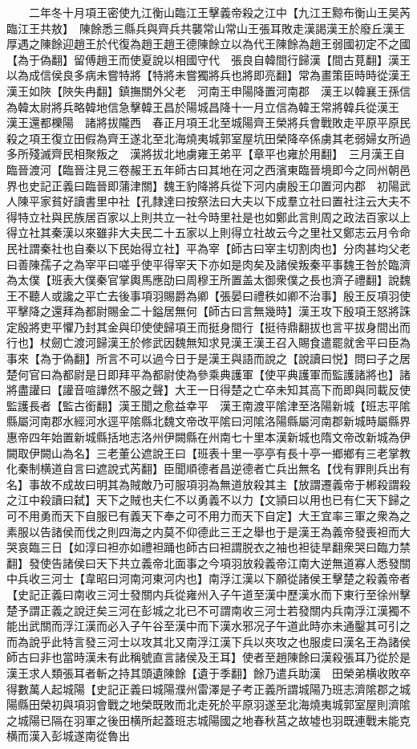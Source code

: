 　　二年冬十月項王密使九江衡山臨江王擊義帝殺之江中【九江王黥布衡山王吴芮臨江王共敖】　陳餘悉三縣兵與齊兵共襲常山常山王張耳敗走漢謁漢王於廢丘漢王厚遇之陳餘迎趙王於代復為趙王趙王德陳餘立以為代王陳餘為趙王弱國初定不之國【為于偽翻】留傅趙王而使夏說以相國守代　張良自韓間行歸漢【間古莧翻】漢王以為成信侯良多病未嘗特將【特將未嘗獨將兵也將即亮翻】常為畫策臣時時從漢王　漢王如陜【陜失冉翻】鎮撫關外父老　河南王申陽降置河南郡　漢王以韓襄王孫信為韓太尉將兵略韓地信急擊韓王昌於陽城昌降十一月立信為韓王常將韓兵從漢王　漢王還都櫟陽　諸將拔隴西　春正月項王北至城陽齊王榮將兵會戰敗走平原平原民殺之項王復立田假為齊王遂北至北海燒夷城郭室屋坑田榮降卒係虜其老弱婦女所過多所殘滅齊民相聚叛之　漢將拔北地虜雍王弟平【章平也雍於用翻】　三月漢王自臨晉渡河【臨晉注見三卷赧王五年師古曰其地在河之西濱東臨晉境即今之同州朝邑界也史記正義曰臨晉即蒲津關】魏王豹降將兵從下河内虜殷王卬置河内郡　初陽武人陳平家貧好讀書里中社【孔隸達曰按祭法曰大夫以下成羣立社曰置社注云大夫不得特立社與民族居百家以上則共立一社今時里社是也如鄭此言則周之政法百家以上得立社其秦漢以來雖非大夫民二十五家以上則得立社故云今之里社又鄭志云月令命民社謂秦社也自秦以下民始得立社】平為宰【師古曰宰主切割肉也】分肉甚均父老曰善陳孺子之為宰平曰嗟乎使平得宰天下亦如是肉矣及諸侯叛秦平事魏王咎於臨濟為太僕【班表大僕秦官掌輿馬應劭曰周穆王所置盖太御衆僕之長也濟子禮翻】說魏王不聽人或讒之平亡去後事項羽賜爵為卿【張晏曰禮秩如卿不治事】殷王反項羽使平擊降之還拜為都尉賜金二十鎰居無何【師古曰言無幾時】漢王攻下殷項王怒將誅定殷將吏平懼乃封其金與印使使歸項王而挺身間行【挺待鼎翻拔也言平拔身間出而行也】杖劒亡渡河歸漢王於修武因魏無知求見漢王漢王召入賜食遣罷就舍平曰臣為事來【為于偽翻】所言不可以過今日于是漢王與語而說之【說讀曰悦】問曰子之居楚何官曰為都尉是日即拜平為都尉使為參乘典護軍【使平典護軍而監護諸將也】諸將盡讙曰【讙音喧譁然不服之聲】大王一日得楚之亡卒未知其高下而即與同載反使監護長者【監古銜翻】漢王聞之愈益幸平　漢王南渡平隂津至洛陽新城【班志平隂縣屬河南郡水經河水逕平隂縣北魏文帝改平隂曰河隂洛陽縣屬河南郡新城時屬縣界惠帝四年始置新城縣括地志洛州伊闕縣在州南七十里本漢新城也隋文帝改新城為伊闕取伊闕山為名】三老董公遮說王曰【班表十里一亭亭有長十亭一鄉鄉有三老掌教化秦制横道自言曰遮說式芮翻】臣聞順德者昌逆德者亡兵出無名【伐有罪則兵出有名】事故不成故曰明其為賊敵乃可服項羽為無道放殺其主【放謂遷義帝于郴殺謂殺之江中殺讀曰弑】天下之賊也夫仁不以勇義不以力【文頴曰以用也已有仁天下歸之可不用勇而天下自服已有義天下奉之可不用力而天下自定】大王宜率三軍之衆為之素服以告諸侯而伐之則四海之内莫不仰德此三王之舉也于是漢王為義帝發喪袒而大哭哀臨三日【如淳曰袒亦如禮袒踊也師古曰袒謂脱衣之袖也袒徒旱翻衆哭曰臨力禁翻】發使告諸侯曰天下共立義帝北面事之今項羽放殺義帝江南大逆無道寡人悉發關中兵收三河士【韋昭曰河南河東河内也】南浮江漢以下願從諸侯王擊楚之殺義帝者【史記正義曰南收三河士發關内兵從雍州入子午道至漢中歷漢水而下東行至徐州擊楚予謂正義之說迂矣三河在彭城之北已不可謂南收三河士若發關内兵南浮江漢獨不能出武關而浮江漢而必入子午谷至漢中而下漢水邪况子午道此時亦未通鑿其可引之而為說乎此特言發三河士以攻其北又南浮江漢下兵以夾攻之也服䖍曰漢名王為諸侯師古曰非也當時漢未有此稱號直言諸侯及王耳】使者至趙陳餘曰漢殺張耳乃從於是漢王求人類張耳者斬之持其頭遺陳餘【遺于季翻】餘乃遣兵助漢　田榮弟横收敗卒得數萬人起城陽【史記正義曰城陽濮州雷澤是子考正義所謂城陽乃班志濟隂郡之城陽縣田榮初與項羽會戰之地榮既敗而北走死於平原羽遂至北海燒夷城郭室屋則濟隂之城陽已隔在羽軍之後田横所起蓋班志城陽國之地春秋莒之故墟也羽既連戰未能克横而漢入彭城遂南從魯出